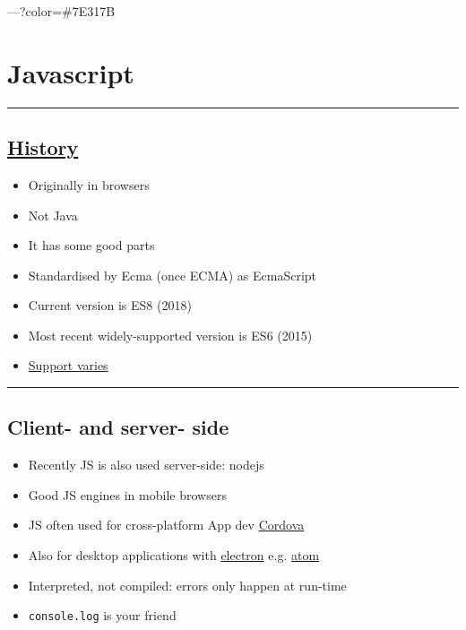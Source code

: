---?color=\#7E317B

\hypertarget{javascript}{%
\section{Javascript}\label{javascript}}

\begin{center}\rule{0.5\linewidth}{\linethickness}\end{center}

\hypertarget{history}{%
\subsection{\texorpdfstring{\href{https://app.pluralsight.com/player?name=javascript-good-parts-m2\&mode=live\&clip=0\&course=javascript-good-parts\&author=douglas-crockford}{History}}{History}}\label{history}}

\begin{itemize}
\tightlist
\item
  Originally in browsers
\item
  Not Java
\item
  It has some good parts
\item
  Standardised by Ecma (once ECMA) as EcmaScript
\item
  Current version is ES8 (2018)
\item
  Most recent widely-supported version is ES6 (2015)
\item
  \href{http://kangax.github.io/compat-table/es6/}{Support varies}
\end{itemize}

\begin{center}\rule{0.5\linewidth}{\linethickness}\end{center}

\hypertarget{client--and-server--side}{%
\subsection{Client- and server- side}\label{client--and-server--side}}

\begin{itemize}
\tightlist
\item
  Recently JS is also used server-side: nodejs
\item
  Good JS engines in mobile browsers
\item
  JS often used for cross-platform App dev
  \href{https://cordova.apache.org/}{Cordova}
\item
  Also for desktop applications with
  \href{https://electronjs.org/}{electron} e.g.
  \href{https://atom.io/}{atom}
\item
  Interpreted, not compiled: errors only happen at run-time
\item
  \texttt{console.log} is your friend
\end{itemize}

